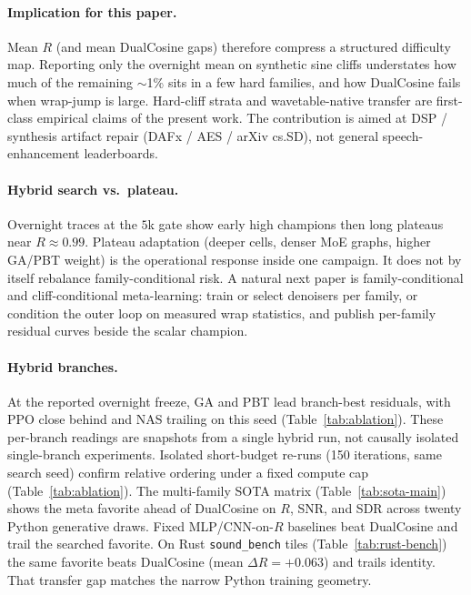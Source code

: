 \paragraph{Implication for this paper.}
Mean $R$ (and mean DualCosine gaps) therefore compress a structured difficulty map.
Reporting only the overnight mean on synthetic sine cliffs understates how much of the remaining $\sim$1\% sits in a few hard families, and how DualCosine fails when wrap-jump is large.
Hard-cliff strata and wavetable-native transfer are first-class empirical claims of the present work.
The contribution is aimed at DSP / synthesis artifact repair (DAFx / AES / arXiv cs.SD), not general speech-enhancement leaderboards.

\paragraph{Hybrid search vs.\ plateau.}
Overnight traces at the $5$k gate show early high champions then long plateaus near $R\approx 0.99$.
Plateau adaptation (deeper cells, denser MoE graphs, higher GA/PBT weight) is the operational response inside one campaign. It does not by itself rebalance family-conditional risk.
A natural next paper is family-conditional and cliff-conditional meta-learning: train or select denoisers per family, or condition the outer loop on measured wrap statistics, and publish per-family residual curves beside the scalar champion.

\paragraph{Hybrid branches.}
At the reported overnight freeze, GA and PBT lead branch-best residuals, with PPO close behind and NAS trailing on this seed (Table~\ref{tab:ablation}).
These per-branch readings are snapshots from a single hybrid run, not causally isolated single-branch experiments.
Isolated short-budget re-runs (150 iterations, same search seed) confirm relative ordering under a fixed compute cap (Table~\ref{tab:ablation}).
The multi-family SOTA matrix (Table~\ref{tab:sota-main}) shows the meta favorite ahead of DualCosine on $R$, SNR, and SDR across twenty Python generative draws. Fixed MLP/CNN-on-$R$ baselines beat DualCosine and trail the searched favorite.
On Rust \texttt{sound\_bench} tiles (Table~\ref{tab:rust-bench}) the same favorite beats DualCosine (mean $\Delta R={+}0.063$) and trails identity. That transfer gap matches the narrow Python training geometry.
